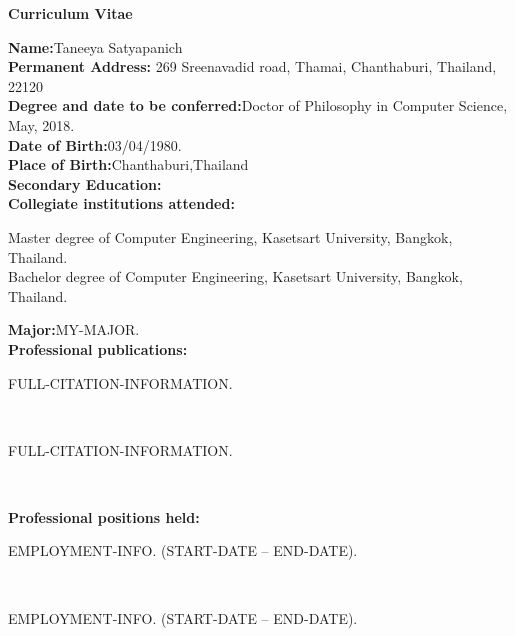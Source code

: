 \begin{titlepage}

\begin{center}
\vspace{0.1in}
\large{\bf Curriculum Vitae}
\bigskip \bigskip
\end{center}

\begin{flushleft}
  {\bf Name:}{\hspace{3mm}}Taneeya Satyapanich\\
	{\bf Permanent Address:}{\hspace{3mm}} 269 Sreenavadid road, Thamai, Chanthaburi, Thailand, 22120\\
	{\bf Degree and date to be conferred:}{\hspace{3mm}}Doctor of Philosophy in Computer Science, May, 2018. \\
	{\bf Date of Birth:}{\hspace{3mm}}03/04/1980. \\
	{\bf Place of Birth:}{\hspace{3mm}}Chanthaburi,Thailand \\
	{\bf Secondary Education:}{\hspace{3mm}}\\
	{\bf Collegiate institutions attended:}\\
	\begin{singlespace} 
	{\hspace{0.4in}} Master degree of Computer Engineering, Kasetsart University, Bangkok, Thailand.\\
	{\hspace{0.4in}}{ Bachelor degree of Computer Engineering, Kasetsart University, Bangkok, Thailand.} \\
	\end{singlespace} 
	\vspace{8pt}
	{\bf Major:}{\hspace{3mm}}MY-MAJOR.\\	
	{\bf Professional publications:}\\
	\begin{singlespace} 
  {\hspace{0.4in}} \parbox[t]{5.5in}{FULL-CITATION-INFORMATION.}\\
  {\vspace{5pt}}
  {\hspace{0.4in}} \parbox[t]{5.5in}{FULL-CITATION-INFORMATION.}\\
  \end{singlespace} 
  \vspace{8pt}
	{\bf Professional positions held:}\\
	\begin{singlespace}
	{\hspace{0.4in}}\parbox[t]{5.5in}{EMPLOYMENT-INFO. (START-DATE -- END-DATE).}\\
	{\vspace{5pt}}
	{\hspace{0.4in}}\parbox[t]{5.5in}{EMPLOYMENT-INFO. (START-DATE -- END-DATE).}\\
	\end{singlespace}
\end{flushleft}
       
\end{titlepage}
\par\vfil


